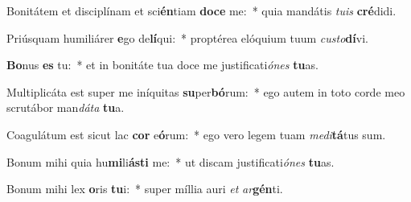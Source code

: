 \item Bonitátem et disciplínam et sci\textbf{én}tiam \textbf{do}\textbf{ce} me:~* quia mandátis \textit{tu}\textit{is} \textbf{cré}didi.
\item Priúsquam humiliárer \textbf{e}go de\textbf{lí}qui:~* proptérea elóquium tuum \textit{cus}\textit{to}\textbf{dí}vi.
\item \textbf{Bo}nus \textbf{es} tu:~* et in bonitáte tua doce me justificati\textit{ó}\textit{nes} \textbf{tu}as.
\item Multiplicáta est super me iníquitas \textbf{su}per\textbf{bó}rum:~* ego autem in toto corde meo scrutábor man\textit{dá}\textit{ta} \textbf{tu}a.
\item Coagulátum est sicut lac \textbf{cor} e\textbf{ó}rum:~* ego vero legem tuam \textit{me}\textit{di}\textbf{tá}tus sum.
\item Bonum mihi quia hu\textbf{mi}li\textbf{ás}\textbf{ti} me:~* ut discam justificati\textit{ó}\textit{nes} \textbf{tu}as.
\item Bonum mihi lex \textbf{o}ris \textbf{tu}i:~* super míllia auri \textit{et} \textit{ar}\textbf{gén}ti.
